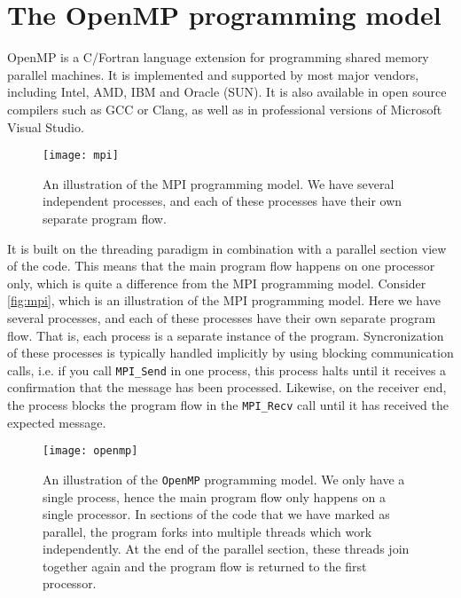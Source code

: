 \section{The OpenMP programming model}

OpenMP is a C/Fortran language extension for programming shared memory parallel
machines. It is implemented and supported by most major vendors, including
Intel, AMD, IBM and Oracle (SUN). It is also available in open source compilers
such as GCC or Clang, as well as in professional versions of Microsoft Visual
Studio.

\begin{figure}[ht]
  \begin{center}
    \texttt{[image: mpi]}
  \end{center}
  \caption{
    An illustration of the MPI programming model. We have several independent
    processes, and each of these processes have their own separate program
    flow.
  }
  \label{fig:mpi}
\end{figure}

It is built on the threading paradigm in combination with a parallel section
view of the code. This means that the main program flow happens on one processor
only, which is quite a difference from the MPI programming model. Consider
\autoref{fig:mpi}, which is an illustration of the MPI programming model. Here
we have several processes, and each of these processes have their own separate
program flow. That is, each process is a separate instance of the program.
Syncronization of these processes is typically handled implicitly by using
blocking communication calls, i.e. if you call \texttt{MPI\_Send} in one
process, this process halts until it receives a confirmation that the message
has been processed. Likewise, on the receiver end, the process blocks the
program flow in the \texttt{MPI\_Recv} call until it has received the expected
message.

\begin{figure}[ht]
  \begin{center}
    \texttt{[image: openmp]}
  \end{center}
  \caption{
    An illustration of the \texttt{OpenMP} programming model. We only have a
    single process, hence the main program flow only happens on a single
    processor. In sections of the code that we have marked as parallel, the
    program forks into multiple threads which work independently. At the end of
    the parallel section, these threads join together again and the program flow
    is returned to the first processor.
  }
  \label{fig:openmp}
\end{figure}

